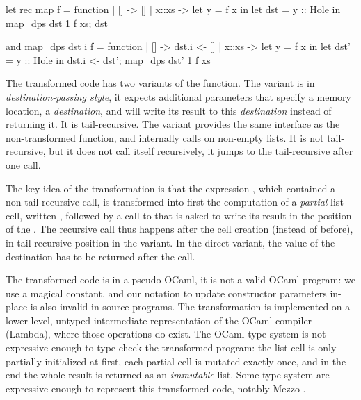 \hspace{-1.6em}
\begin{minipage}{0.5\linewidth}
\begin{Ocaml}
let rec map f = function
| [] -> []
| x::xs ->
  let y = f x in
  let dst = y :: Hole in
  map_dps dst 1 f xs;
  dst
\end{Ocaml}
\end{minipage}
\hfill
\begin{minipage}{0.5\linewidth}
\begin{Ocaml}
and map_dps dst i f = function
| [] ->
  dst.i <- []
| x::xs ->
  let y = f x in
  let dst' = y :: Hole in
  dst.i <- dst';
  map_dps dst' 1 f xs
\end{Ocaml}
\end{minipage}

The transformed code has two variants of the  function. The
 variant is in \emph{destination-passing style}, it
expects additional parameters that specify a memory location,
a \emph{destination}, and will write its result to this
\emph{destination} instead of returning it. It is tail-recursive. The
 variant provides the same interface as the non-transformed
function, and internally calls  on non-empty lists. It
is not tail-recursive, but it does not call itself recursively, it
jumps to the tail-recursive  after one call.

The key idea of the transformation is that the expression , which contained a non-tail-recursive call, is transformed
into first the computation of a \emph{partial} list cell, written %
, followed by a call to  that is asked
to write its result in the position of the . The recursive
call thus happens after the cell creation (instead of before), in
tail-recursive position in the  variant. In the direct
variant, the value of the destination  has to be returned
after the call.

The transformed code is in a pseudo-OCaml, it is not a valid OCaml
program: we use a magical  constant, and our notation
 to update constructor parameters in-place is also
invalid in source programs. The transformation is implemented on
a lower-level, untyped intermediate representation of the OCaml
compiler (Lambda), where those operations do exist. The OCaml type
system is not expressive enough to type-check the transformed program:
the list cell is only partially-initialized at first, each partial
cell is mutated exactly once, and in the end the whole result is
returned as an \emph{immutable} list. Some type system are expressive
enough to represent this transformed code, notably Mezzo
\citep*{mezzo}.


